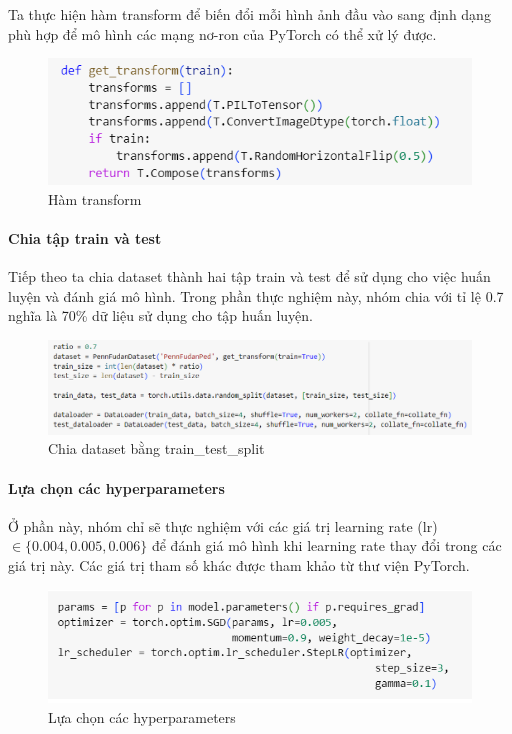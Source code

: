 Ta thực hiện hàm transform để biến đổi mỗi hình ảnh đầu vào sang định dạng phù hợp để mô hình các mạng nơ-ron của PyTorch có thể xử lý được. 
\begin{figure}[h!]
  \centering
  \includegraphics[scale=0.65]{graphics/transform.png}
  \caption{Hàm transform}
\end{figure}

\paragraph{Chia tập train và test\\}
Tiếp theo ta chia dataset thành hai tập train và test để sử dụng cho việc huấn luyện và đánh giá mô hình. Trong phần thực nghiệm này, nhóm chia với tỉ lệ 0.7 nghĩa là 70\% dữ liệu sử dụng cho tập huấn luyện.

\pagebreak

\begin{figure}[h!]
  \centering
  \includegraphics[scale=0.65]{graphics/split.png}
  \caption{Chia dataset bằng train\_test\_split}
\end{figure}

\paragraph{Lựa chọn các hyperparameters\\}
Ở phần này, nhóm chỉ sẽ thực nghiệm với các giá trị learning rate (lr) $\in \{0.004, 0.005, 0.006\}$ để đánh giá mô hình khi learning rate thay đổi trong các giá trị này. Các giá trị tham số khác được tham khảo từ thư viện PyTorch.
\begin{figure}[h!]
  \centering
  \includegraphics[scale=0.8]{graphics/params.png}
  \caption{Lựa chọn các hyperparameters}
\end{figure}

